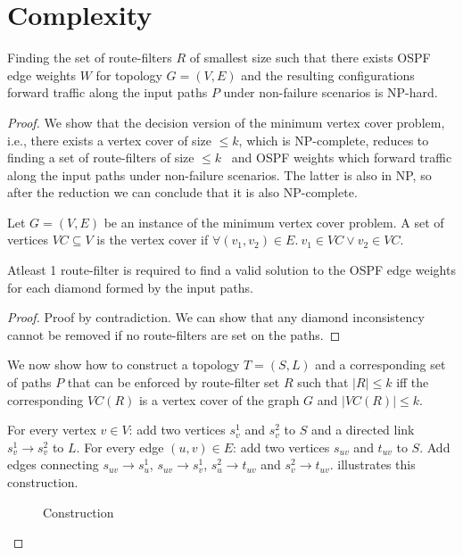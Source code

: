 \section{Complexity}
\begin{theorem}
Finding the set of route-filters $R$ of smallest size such
 that there exists OSPF edge weights $W$ for topology $G=(V,E)$ 
 and the resulting configurations forward traffic along the
input paths $P$ under non-failure scenarios is NP-hard.
\end{theorem}

\begin{proof}
We show that the decision version of the minimum 
vertex cover problem, i.e., there exists a vertex cover
of size $ \leq k$, which is NP-complete, 
reduces to finding a set of route-filters of size $ \leq k$ \
and OSPF weights which forward traffic along the
input paths under non-failure scenarios. 
The latter is also in NP, so after the reduction we 
can conclude that it is also NP-complete.

Let $G = (V,E)$ be an instance of the 
minimum vertex cover problem. A set of
vertices $VC \subseteq V$ is the vertex cover
if $\forall (v_1, v_2) \in E. ~v_1 \in VC \vee v_2 \in VC$. 
\begin{lemma}
	Atleast 1 route-filter is required to find a valid solution to the
	OSPF edge weights for each diamond formed by the input paths.
\end{lemma}
\begin{proof}
	Proof by contradiction. We can show that any diamond inconsistency 
	cannot be removed if no route-filters are set on the paths.
\end{proof}
We now show how to construct a topology $T=(S,L)$ 
and a corresponding set of paths $P$ that can be 
enforced by route-filter set $R$ such that $|R| \leq k$  
iff the corresponding $VC(R)$ is a vertex cover of 
the graph $G$ and $|VC(R)| \leq k$.

For every vertex $v \in V$: add two vertices $s_v^1$ 
and $s_v^2$ to $S$ and a directed link $s_v^1 \rightarrow s_v^2$ to $L$. 
For every edge $(u,v) \in E$: add two vertices $s_{uv}$
and $t_{uv}$ to $S$. Add edges
connecting $s_{uv} \rightarrow s_{u}^1$, $s_{uv} \rightarrow s_{v}^1$,
$s_{u}^2 \rightarrow t_{uv}$ and $s_{v}^2 \rightarrow t_{uv}$. 
 illustrates this construction.

\begin{figure}[H]
	\centering
	\caption{Construction}
	\label{fig:rfcomplexity}
\end{figure}
	


\end{proof}